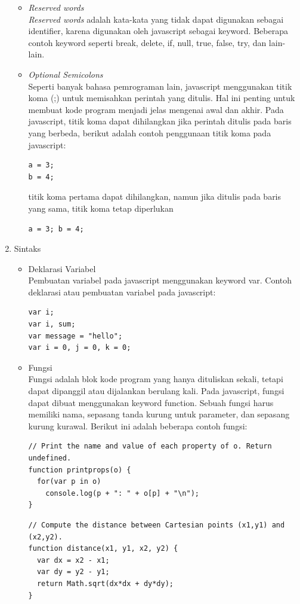 \begin{enumerate}
\begin{itemize}
\item \textit{Reserved words} \\
\textit{Reserved words} adalah kata-kata yang tidak dapat digunakan sebagai
identifier, karena digunakan oleh javascript sebagai keyword. Beberapa contoh keyword seperti break, delete, if, 
null, true, false, try, dan lain-lain.

\item \textit{Optional Semicolons} \\
Seperti banyak bahasa pemrograman lain, javascript menggunakan titik koma (;) untuk memisahkan perintah 
yang ditulis. Hal ini penting untuk membuat kode program menjadi jelas mengenai awal dan akhir. Pada 
javascript, titik koma dapat dihilangkan jika perintah ditulis pada baris yang berbeda, berikut adalah 
contoh penggunaan titik koma pada javascript:
\begin{verbatim}
a = 3;
b = 4;
\end{verbatim}
titik koma pertama dapat dihilangkan, namun jika ditulis pada baris yang sama, titik koma tetap diperlukan
\begin{verbatim}
a = 3; b = 4;
\end{verbatim}
\end{itemize}

\item Sintaks
\begin{itemize}
\item Deklarasi Variabel \\
Pembuatan variabel pada javascript menggunakan keyword var. Contoh deklarasi atau pembuatan variabel pada javascript:
\begin{verbatim}
var i;
var i, sum;
var message = "hello";
var i = 0, j = 0, k = 0;
\end{verbatim}

\item Fungsi \\
Fungsi adalah blok kode program yang hanya dituliskan sekali, tetapi dapat
dipanggil atau dijalankan berulang kali. Pada javascript, fungsi dapat dibuat menggunakan keyword function. 
Sebuah fungsi harus memiliki nama, sepasang tanda kurung untuk parameter, dan sepasang kurung kurawal. 
Berikut ini adalah beberapa contoh fungsi:
\begin{verbatim}
// Print the name and value of each property of o. Return undefined.
function printprops(o) {
  for(var p in o)
    console.log(p + ": " + o[p] + "\n");
}
\end{verbatim}
\begin{verbatim}
// Compute the distance between Cartesian points (x1,y1) and (x2,y2).
function distance(x1, y1, x2, y2) {
  var dx = x2 - x1;
  var dy = y2 - y1;
  return Math.sqrt(dx*dx + dy*dy);
}
\end{verbatim}
\end{itemize}
\end{enumerate}

